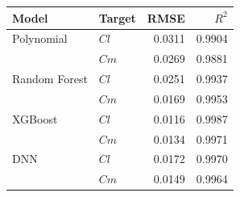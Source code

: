 \begin{tabular}{llrr}
\toprule
Model & Target & RMSE & $R^2$ \\ \midrule
Polynomial & $Cl$ & 0.0311 & 0.9904 \\
 & $Cm$ & 0.0269 & 0.9881 \\
Random Forest & $Cl$ & 0.0251 & 0.9937 \\
 & $Cm$ & 0.0169 & 0.9953 \\
XGBoost & $Cl$ & 0.0116 & 0.9987 \\
 & $Cm$ & 0.0134 & 0.9971 \\
DNN & $Cl$ & 0.0172 & 0.9970 \\
 & $Cm$ & 0.0149 & 0.9964 \\
\bottomrule
\end{tabular}